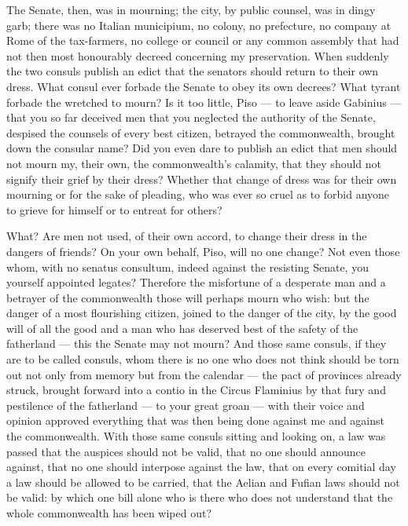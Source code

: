  The Senate, then, was in mourning; the city, by public counsel, was in dingy garb; there was no Italian municipium, no colony, no prefecture, no company at Rome of the tax-farmers, no college or council or any common assembly that had not then most honourably decreed concerning my preservation. When suddenly the two consuls publish an edict that the senators should return to their own dress. What consul ever forbade the Senate to obey its own decrees? What tyrant forbade the wretched to mourn? Is it too little, Piso --- to leave aside Gabinius --- that you so far deceived men that you neglected the authority of the Senate, despised the counsels of every best citizen, betrayed the commonwealth, brought down the consular name? Did you even dare to publish an edict that men should not mourn my, their own, the commonwealth's calamity, that they should not signify their grief by their dress? Whether that change of dress was for their own mourning or for the sake of pleading, who was ever so cruel as to forbid anyone to grieve for himself or to entreat for others?

 What? Are men not used, of their own accord, to change their dress in the dangers of friends? On your own behalf, Piso, will no one change? Not even those whom, with no senatus consultum, indeed against the resisting Senate, you yourself appointed legates? Therefore the misfortune of a desperate man and a betrayer of the commonwealth those will perhaps mourn who wish: but the danger of a most flourishing citizen, joined to the danger of the city, by the good will of all the good and a man who has deserved best of the safety of the fatherland --- this the Senate may not mourn? And those same consuls, if they are to be called consuls, whom there is no one who does not think should be torn out not only from memory but from the calendar --- the pact of provinces already struck, brought forward into a contio in the Circus Flaminius by that fury and pestilence of the fatherland --- to your great groan --- with their voice and opinion approved everything that was then being done against me and against the commonwealth. With those same consuls sitting and looking on, a law was passed that the auspices should not be valid, that no one should announce against, that no one should interpose against the law, that on every comitial day a law should be allowed to be carried, that the Aelian and Fufian laws should not be valid: by which one bill alone who is there who does not understand that the whole commonwealth has been wiped out?

